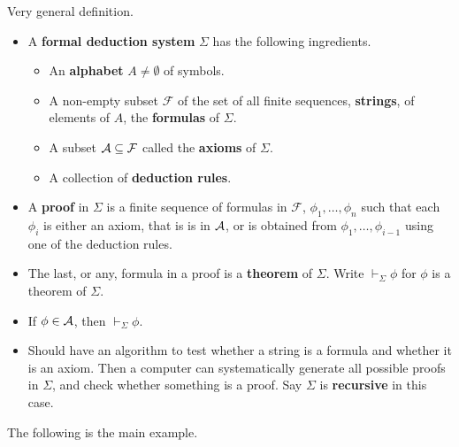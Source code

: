 \begin{definition}
Very general definition.
\begin{itemize}
\item A \textbf{formal deduction system} $ \Sigma $ has the following ingredients.
\begin{itemize}
\item An \textbf{alphabet} $ A \ne \emptyset $ of symbols.
\item A non-empty subset $ \mathcal{F} $ of the set of all finite sequences, \textbf{strings}, of elements of $ A $, the \textbf{formulas} of $ \Sigma $.
\item A subset $ \AA \subseteq \mathcal{F} $ called the \textbf{axioms} of $ \Sigma $.
\item A collection of \textbf{deduction rules}.
\end{itemize}
\item A \textbf{proof} in $ \Sigma $ is a finite sequence of formulas in $ \mathcal{F} $, $ \phi_1, \dots, \phi_n $ such that each $ \phi_i $ is either an axiom, that is is in $ \AA $, or is obtained from $ \phi_1, \dots, \phi_{i - 1} $ using one of the deduction rules.
\item The last, or any, formula in a proof is a \textbf{theorem} of $ \Sigma $. Write $ \vdash_\Sigma \phi $ for $ \phi $ is a theorem of $ \Sigma $.
\end{itemize}
\end{definition}

\begin{remark2}
\hfill
\begin{itemize}
\item If $ \phi \in \AA $, then $ \vdash_\Sigma \phi $.
\item Should have an algorithm to test whether a string is a formula and whether it is an axiom. Then a computer can systematically generate all possible proofs in $ \Sigma $, and check whether something is a proof. Say $ \Sigma $ is \textbf{recursive} in this case.
\end{itemize}
\end{remark2}

The following is the main example.

